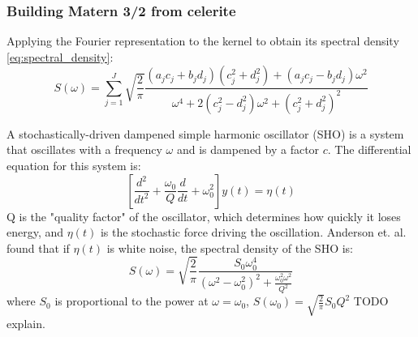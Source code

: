\subsubsection{Building Matern 3/2 from celerite}
Applying the Fourier representation to the kernel to obtain its spectral density \ref{eq:spectral_density}:
\begin{equation*}
    S(\omega) = \sum_{j=1}^J \sqrt{\frac{2}{\pi}} \frac{(a_j c_j + b_j d_j) (c_j^2 + d_j^2) + (a_j c_j - b_j d_j) \omega^2}{\omega^4 + 2(c_j^2 - d_j^2) \omega^2 + (c_j^2 + d_j^2)^2}
\end{equation*}

A stochastically-driven dampened simple harmonic oscillator (SHO) is a system that oscillates with a frequency $\omega$ and is dampened by a factor $c$. The differential equation for this system is:
\begin{equation*}
    \left[ \frac{d^2}{dt^2} + \frac{\omega_0}{Q} \frac{d}{dt} + \omega_0^2 \right] y(t) = \eta(t)
\end{equation*}
Q is the "quality factor" of the oscillator, which determines how quickly it loses energy, and $\eta(t)$ is the stochastic force driving the oscillation. Anderson et. al. \cite{sho-spectral-density} found that if $\eta(t)$ is white noise, the spectral density of the SHO is:
\begin{equation*}
    S(\omega) = \sqrt{\frac{2}{\pi}} \frac{S_0 \omega_0^4}{(\omega^2 - \omega_0^2)^2 + \frac{\omega_0^2 \omega^2}{Q^2}}
\end{equation*}
where $S_0$ is proportional to the power at $\omega = \omega_0$, $S(\omega_0) = \sqrt{\frac{2}{\pi}} S_0 Q^2$ TODO explain.

